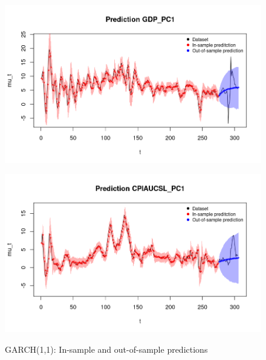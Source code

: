 \begin{figure}[h]
    \centering
    \begin{minipage}[t]{0.7\textwidth}
        \centering
        \includegraphics[width=\textwidth]{../Images/5-GARCH/gdp_prediction.png}
        \label{fig:GARCH_first}
    \end{minipage}
    \begin{minipage}[t]{0.7\textwidth}
        \centering
        \includegraphics[width=\textwidth]{../Images/5-GARCH/infl_prediction.png}
        \label{fig:GARCH_second}
    \end{minipage}
    \caption{GARCH(1,1): In-sample and out-of-sample predictions}
    \label{fig:GARCH_combined}
\end{figure}
